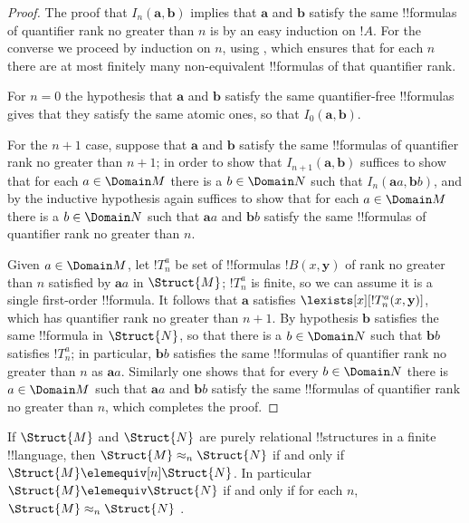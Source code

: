 \documentclass[../../../include/open-logic-section]{subfiles}
\begin{document}
\begin{proof}
  The proof that $I_n(\mathbf{a},\mathbf{b})$ implies that
  $\mathbf{a}$ and $\mathbf{b}$ satisfy the same !!{formula}s of
  quantifier rank no greater than $n$ is by an easy induction on
  $!A$. For the converse we proceed by induction on $n$, using
  , which ensures that for each $n$
  there are at most finitely many non-equivalent !!{formula}s of that
  quantifier rank.

  For $n=0$ the hypothesis that $\mathbf{a}$ and $\mathbf{b}$ satisfy
  the same quantifier-free !!{formula}s gives that they satisfy the same
  atomic ones, so that $I_0(\mathbf{a},\mathbf{b})$.

  For the $n+1$ case, suppose that $\mathbf{a}$ and $\mathbf{b}$
  satisfy the same !!{formula}s of quantifier rank no greater than
  $n+1$; in order to show that $I_{n+1}(\mathbf{a},\mathbf{b})$
  suffices to show that for each $a \in \Domain M$ there is a $b \in
  \Domain N$ such that $I_n(\mathbf{a}a,\mathbf{b}b)$, and by the
  inductive hypothesis again suffices to show that for each $a \in
  \Domain M$ there is a $b \in \Domain N$ such that $\mathbf{a}a$ and
  $\mathbf{b}b$ satisfy the same !!{formula}s of quantifier rank no
  greater than $n$.

  Given $a \in \Domain M$, let $!T^a_n$ be set of !!{formula}s
  $!B(x,\mathbf{y})$ of rank no greater than $n$ satisfied by
  $\mathbf{a}a$ in $\Struct{M}$; $!T^a_n$ is finite, so we can
  assume it is a single first-order !!{formula}. It follows that
  $\mathbf{a}$ satisfies $\lexists[x][!T^a_n(x,\mathbf{y})]$, which
  has quantifier rank no greater than $n+1$. By hypothesis
  $\mathbf{b}$ satisfies the same !!{formula} in $\Struct{N}$, so that
  there is a $b \in \Domain N$ such that $\mathbf{b}b$ satisfies
  $!T^a_n$; in particular, $\mathbf{b}b$ satisfies the same
  !!{formula}s of quantifier rank no greater than $n$ as
  $\mathbf{a}a$. Similarly one shows that for every $b \in \Domain N$
  there is $a\in \Domain M$ such that $\mathbf{a}a$ and $\mathbf{b}b$
  satisfy the same !!{formula}s of quantifier rank no greater than $n$,
  which completes the proof.
\end{proof}

\begin{cor}
  If $\Struct{M}$ and $\Struct{N}$ are purely relational !!{structure}s
  in a finite !!{language}, then $\Struct{M} \approx_n\Struct{N}$ if and
  only if $\Struct{M} \elemequiv[n] \Struct{N}$. In particular
  $\Struct{M} \elemequiv \Struct{N}$ if and only if for each $n$,
  $\Struct{M} \approx_n \Struct{N}$ .
\end{cor}
\end{document}
